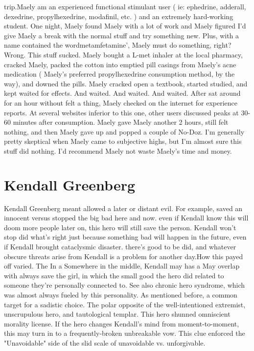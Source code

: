 \documentclass[12pt]{book}
\begin{document}
trip.Maely am an experienced functional stimulant user ( ie: ephedrine, adderall, dexedrine, propylhexedrine, modafinil, etc. ) and an extremely hard-working student. One night, Maely found Maely with a lot of work and Maely figured I'd give Maely a break with the normal stuff and try something new. Plus, with a name contained the wordmetamfetamine', Maely must do something, right? Wrong. This stuff sucked. Maely bought a L-met inhaler at the local pharmacy, cracked Maely, packed the cotton into emptied pill casings from Maely's acne medication ( Maely's preferred propylhexedrine consumption method, by the way), and downed the pills. Maely cracked open a textbook, started studied, and kept waited for effects. And waited. And waited. And waited. After sat around for an hour without felt a thing, Maely checked on the internet for experience reports. At several websites inferior to this one, other users discussed peaks at 30-60 minutes after consumption. Maely gave Maely another 2 hours, still felt nothing, and then Maely gave up and popped a couple of No-Doz. I'm generally pretty skeptical when Maely came to subjective highs, but I'm almost sure this stuff did nothing. I'd recommend Maely not waste Maely's time and money.



\chapter{Kendall Greenberg}

Kendall Greenberg meant allowed a later or distant evil. For example, saved an innocent versus stopped the big bad here and now. even if Kendall know this will doom more people later on, this hero will still save the person. Kendall won't stop did what's right just because something bad will happen in the future, even if Kendall brought cataclysmic disaster. there's good to be did, and whatever obscure threats arise from Kendall is a problem for another day.How this payed off varied. The In a Somewhere in the middle, Kendall may has a May overlap with always save the girl, in which the small good the hero did related to someone they're personally connected to. See also chronic hero syndrome, which was almost always fueled by this personality. As mentioned before, a common target for a sadistic choice. The polar opposite of the well-intentioned extremist, unscrupulous hero, and tautological templar. This hero shunned omniscient morality license. If the hero changes Kendall's mind from moment-to-moment, this may turn in to a frequently-broken unbreakable vow. This clue enforced the "Unavoidable" side of the slid scale of unavoidable vs. unforgivable.
\end{document}
